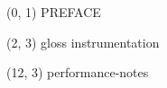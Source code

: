 \documentclass[10pt]{article}
\begin{document}
\begin{textblock}{23} (0, 1)
\center\huge PREFACE
\end{textblock}

\begin{textblock}{9} (2, 3)
    {gloss}
    {instrumentation}
\end{textblock}

\begin{textblock}{9} (12, 3)
    {performance-notes}   
\end{textblock}
\end{document}

